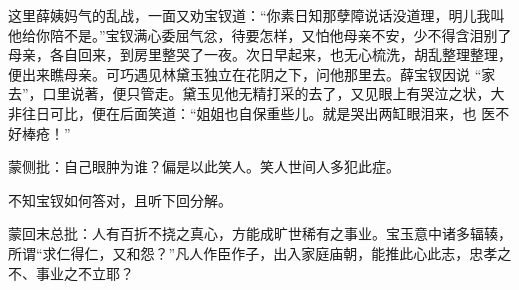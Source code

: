 \begin{parag}
    这里薛姨妈气的乱战，一面又劝宝钗道：“你素日知那孽障说话没道理，明儿我叫他给你陪不是。”宝钗满心委屈气忿，待要怎样，又怕他母亲不安，少不得含泪别了母亲，各自回来，到房里整哭了一夜。次日早起来，也无心梳洗，胡乱整理整理，便出来瞧母亲。可巧遇见林黛玉独立在花阴之下，问他那里去。薛宝钗因说 “家去”，口里说著，便只管走。黛玉见他无精打采的去了，又见眼上有哭泣之状，大非往日可比，便在后面笑道：“姐姐也自保重些儿。就是哭出两缸眼泪来，也 医不好棒疮！”\begin{note}蒙侧批：自己眼肿为谁？偏是以此笑人。笑人世间人多犯此症。\end{note}不知宝钗如何答对，且听下回分解。
\end{parag}


\begin{parag}
    \begin{note}蒙回末总批：人有百折不挠之真心，方能成旷世稀有之事业。宝玉意中诸多辐辏，所谓“求仁得仁，又和怨？”凡人作臣作子，出入家庭庙朝，能推此心此志，忠孝之不、事业之不立耶？\end{note}
\end{parag}

